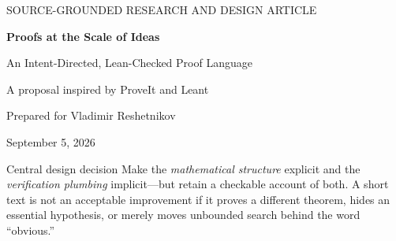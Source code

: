 \documentclass[11pt,a4paper]{article}
\newcommand{\Outline}{\textsc{Outline}}
\theoremstyle{definition}
\theoremstyle{remark}
\numberwithin{equation}{section}
\begin{document}
\thispagestyle{plain}
\begin{center}
{\small\sffamily\color{accent} SOURCE-GROUNDED RESEARCH AND DESIGN ARTICLE}\par\vspace{1em}
{\LARGE\sffamily\bfseries\color{ink} Proofs at the Scale of Ideas}\par\vspace{.55em}
{\Large An Intent-Directed, Lean-Checked Proof Language}\par\vspace{.9em}
{\large A proposal inspired by ProveIt and Leant}\par\vspace{.8em}
Prepared for Vladimir Reshetnikov\par
September 5, 2026
\end{center}
\vspace{.5em}
\begin{abstract}
A useful proof language should let an author say what makes an argument work without repeatedly programming the administrative details of its verification. This article proposes \Outline, a working name for a controlled mathematical language embedded in Lean. Its basic unit is a \emph{semantic checkpoint}: a precisely stated intermediate fact or a certified proof plan such as induction, symmetry reduction, finite reindexing, or a derivative-bound argument. Omitted details become scoped proof obligations, not implicit axioms. Search may use ordinary tactics, structural term synthesis, theorem retrieval, or an external model; acceptance requires a proof of the already fixed Lean statement and an explicit audit of its assumptions.

The proposal is grounded in selected ProveIt modules and in Leant's candidate generation, verification, ranking, and advisory tactic infrastructure. Worked studies include residual-to-root certification, Gaussian-binomial summation, commutation by induction, and a floor-square-root sum. They distinguish cosmetic abbreviation from genuine mathematical reorganization. A small core calculus, a relative soundness argument, contracts for higher-level plans, a reproducible artifact format, an implementation roadmap, and a controlled evaluation design make the proposal concrete. The language is not implemented here; syntax examples are specifications, and no compilation or performance results for them are claimed.
\end{abstract}
\begin{designbox}{Central design decision}
Make the \emph{mathematical structure} explicit and the \emph{verification plumbing} implicit---but retain a checkable account of both. A short text is not an acceptable improvement if it proves a different theorem, hides an essential hypothesis, or merely moves unbounded search behind the word ``obvious.''
\end{designbox}
\clearpage
\tableofcontents
\end{document}
